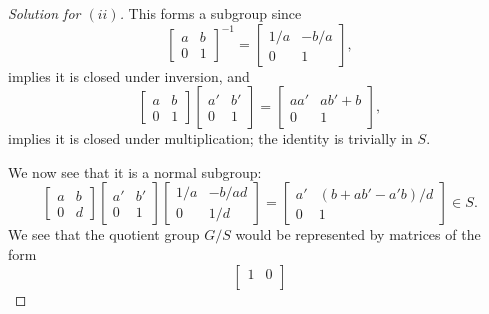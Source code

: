 \documentclass[12pt]{article}
\theoremstyle{remark}
\begin{document}
\begin{proof}[Solution for $(ii)$]
  This forms a subgroup since
  \begin{equation*}
    \begin{bmatrix}
      a & b\\
      0 & 1
    \end{bmatrix}^{-1} =
    \begin{bmatrix}
      1/a & -b/a\\
      0 & 1
    \end{bmatrix},
  \end{equation*}
  implies it is closed under inversion, and
  \begin{equation*}
    \begin{bmatrix}
      a & b\\
      0 & 1
    \end{bmatrix}
    \begin{bmatrix}
      a' & b'\\
      0 & 1
    \end{bmatrix}
    =
    \begin{bmatrix}
      aa' & ab'+b\\
      0 & 1
    \end{bmatrix},
  \end{equation*}
  implies it is closed under multiplication; the identity is trivially in $S$.
  \par We now see that it is a normal subgroup:
  \begin{equation*}
    \begin{bmatrix}
      a & b\\
      0 & d
    \end{bmatrix}
    \begin{bmatrix}
      a' & b'\\
      0 & 1
    \end{bmatrix}
    \begin{bmatrix}
      1/a & -b/ad\\
      0 & 1/d
    \end{bmatrix}
    =
    \begin{bmatrix}
      a' & (b+ab'-a'b)/d\\
      0 & 1
    \end{bmatrix} \in S.
  \end{equation*}
  We see that the quotient group $G/S$ would be represented by matrices of the form
  \begin{equation*}
    \begin{bmatrix}
      1 & 0\\

\end{bmatrix}
\end{equation*}
\end{proof}
\end{document}
